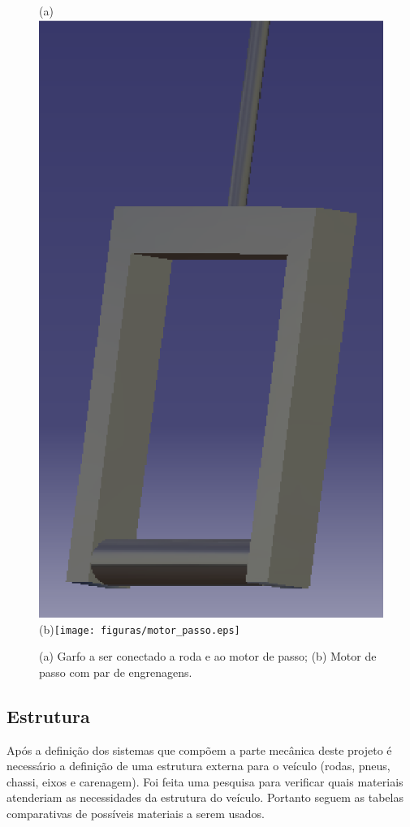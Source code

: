      \begin{figure}[!htbp]
     	\begin{center}
     		(a)\includegraphics[height=.3\textheight]{figuras/direcao2.eps}
        	(b)\texttt{[image: figuras/motor\_passo.eps]}
     		\caption{(a) Garfo a ser conectado a roda e ao motor de passo; (b) Motor de passo com par de engrenagens.}
     	\end{center}
     \end{figure}
      
  \subsection{Estrutura}
  Após a definição dos sistemas que compõem a parte mecânica deste projeto é necessário a definição de uma estrutura externa para o veículo (rodas, pneus, chassi, eixos e carenagem). Foi feita uma pesquisa para verificar quais materiais atenderiam as necessidades da estrutura do veículo. Portanto seguem as tabelas comparativas de possíveis materiais a serem usados.

